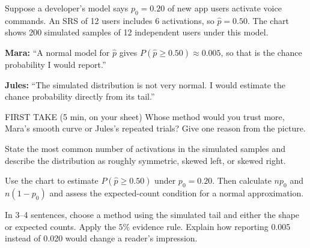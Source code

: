 \documentclass[14pt]{extarticle}
\begin{document}
\pagestyle{empty}


\noindent\begin{minipage}[t]{0.57\linewidth}
\vspace{0pt}
Suppose a developer's model says $p_0=0.20$ of new app users activate voice commands. An SRS of 12 users includes 6 activations, so $\hat p=0.50$. The chart shows 200 simulated samples of 12 independent users under this model.\par\smallskip \textbf{Mara:} ``A normal model for $\hat p$ gives $P(\hat p\ge 0.50)\approx0.005$, so that is the chance probability I would report.''\par \textbf{Jules:} ``The simulated distribution is not very normal. I would estimate the chance probability directly from its tail.''\par
\end{minipage}\hfill
\begin{minipage}[t]{0.40\linewidth}
\vspace{0pt}
\begin{center}
\end{center}
\end{minipage}

\begin{firsttakebox}{FIRST TAKE (5 min, on your sheet)}
Whose method would you trust more, Mara's smooth curve or Jules's repeated trials? Give one reason from the picture.
\end{firsttakebox}

\begin{description}[leftmargin=1.15in, labelwidth=1in, itemsep=2pt, topsep=2pt]
  \item[\dokbadge{1}~(a)] State the most common number of activations in the simulated samples and describe the distribution as roughly symmetric, skewed left, or skewed right.
  \item[\dokbadge{2}~(b)] Use the chart to estimate $P(\hat p\ge0.50)$ under $p_0=0.20$. Then calculate $np_0$ and $n(1-p_0)$ and assess the expected-count condition for a normal approximation.
  \item[\dokbadge{3}~(c)] In 3--4 sentences, choose a method using the simulated tail and either the shape or expected counts. Apply the $5\%$ evidence rule. Explain how reporting 0.005 instead of 0.020 would change a reader's impression.
\end{description}
\end{document}
